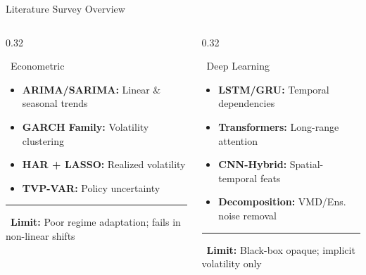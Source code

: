 \documentclass{beamer}
\begin{document}
\begin{frame}[label=lit_overview]{Literature Survey Overview}

\begin{columns}[T]

\begin{column}{0.32\textwidth}
\begin{infocard}{~Econometric}
\scriptsize
\begin{itemize}\setlength\itemsep{1.5pt}
\item \textbf{ARIMA/SARIMA:} Linear \& seasonal trends
\item \textbf{GARCH Family:} Volatility clustering
\item \textbf{HAR + LASSO:} Realized volatility
\item \textbf{TVP-VAR:} Policy uncertainty
\end{itemize}
\vspace{0.06cm}
\hrule
\vspace{0.08cm}
{\tiny\color{accentred}~\textbf{Limit:} Poor regime adaptation; fails in non-linear shifts}
\end{infocard}
\end{column}

\begin{column}{0.32\textwidth}
\begin{purplecard}{~Deep Learning}
\scriptsize
\begin{itemize}\setlength\itemsep{1.5pt}
\item \textbf{LSTM/GRU:} Temporal dependencies
\item \textbf{Transformers:} Long-range attention
\item \textbf{CNN-Hybrid:} Spatial-temporal feats
\item \textbf{Decomposition:} VMD/Ens. noise removal
\end{itemize}
\vspace{0.06cm}
\hrule
\vspace{0.08cm}
{\tiny\color{accentred}~\textbf{Limit:} Black-box opaque; implicit volatility only}
\end{purplecard}
\end{column}


\end{columns}
\end{frame}
\end{document}
